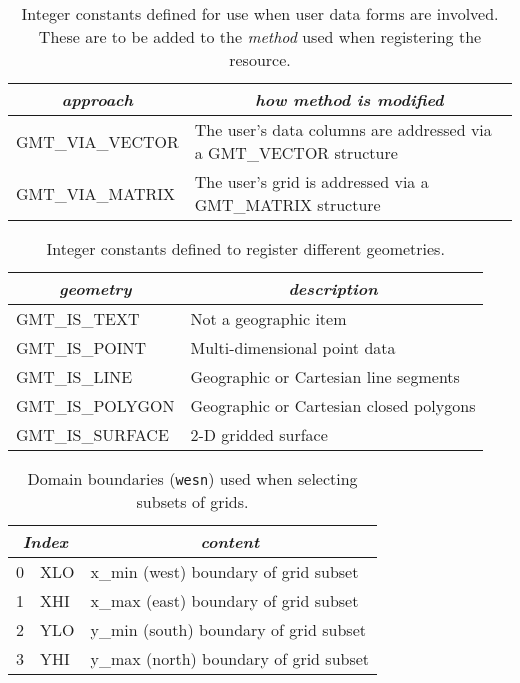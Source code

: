 \documentclass[11pt]{report}
\begin{document}
\begin{table}[h]
\small
\centering
\begin{tabular}{|l|l|} \hline
\multicolumn{1}{|c|}{\emph{approach}} & \multicolumn{1}{c|}{\emph{how method is modified}} \\ \hline
GMT\_VIA\_VECTOR	&       The user's data columns are addressed via a GMT\_VECTOR structure \\ \hline
GMT\_VIA\_MATRIX	&       The user's grid is addressed via a GMT\_MATRIX structure \\ \hline
\end{tabular}
\caption{Integer constants defined for use when user data forms are involved.  These are to be added
to the \emph{method} used when registering the resource.}
\label{tbl:via}
\end{table}

\begin{table}[h]
\small
\centering
\begin{tabular}{|l|l|} \hline
\multicolumn{1}{|c|}{\emph{geometry}} & \multicolumn{1}{c|}{\emph{description}} \\ \hline
GMT\_IS\_TEXT		&       Not a geographic item \\ \hline
GMT\_IS\_POINT		&       Multi-dimensional point data \\ \hline
GMT\_IS\_LINE		&       Geographic or Cartesian line segments \\ \hline
GMT\_IS\_POLYGON	&       Geographic or Cartesian closed polygons \\ \hline
GMT\_IS\_SURFACE	&       2-D gridded surface \\ \hline
\end{tabular}
\caption{Integer constants defined to register different geometries.}
\label{tbl:geometry}
\end{table}

\begin{table}[h]
\small
\centering
\begin{tabular}{|c|l|l|} \hline
\multicolumn{2}{|c|}{\emph{Index}} & \multicolumn{1}{c|}{\emph{content}} \\ \hline
0 & XLO	&       x\_min (west) boundary of grid subset  \\ \hline
1 & XHI	&       x\_max (east) boundary of grid subset  \\ \hline
2 & YLO	&       y\_min (south) boundary of grid subset  \\ \hline
3 & YHI	&       y\_max (north) boundary of grid subset  \\ \hline
\end{tabular}
\caption{Domain boundaries (\texttt{wesn}) used when selecting subsets of grids.}
\label{tbl:wesn}
\end{table}
\end{document}
